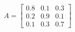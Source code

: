 \documentclass[preview]{standalone}
\begin{document}
\begin{align*}
A = \begin{bmatrix} 0.8 & 0.1 & 0.3 \\ 0.2 & 0.9 & 0.1 \\ 0.1 & 0.3 & 0.7 \end{bmatrix}
\end{align*}
\end{document}
